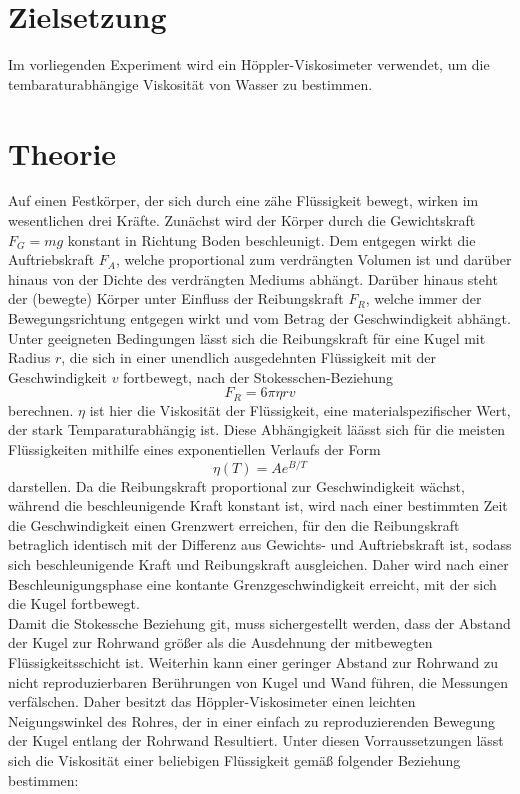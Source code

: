 \section{Zielsetzung}
\label{sec:zielsetzung}
Im vorliegenden Experiment wird ein Höppler-Viskosimeter verwendet, um die  tembaraturabhängige Viskosität von Wasser zu bestimmen.
\section{Theorie}
\label{sec:theorie}
Auf einen Festkörper, der sich durch eine zähe Flüssigkeit bewegt, wirken im wesentlichen drei Kräfte. Zunächst wird der Körper durch die Gewichtskraft $F_G=mg$ konstant in Richtung Boden beschleunigt. Dem entgegen wirkt die Auftriebskraft $F_A$, welche proportional zum verdrängten Volumen ist und darüber hinaus von der Dichte des verdrängten Mediums abhängt. Darüber hinaus steht der (bewegte) Körper unter Einfluss der Reibungskraft $F_R$, welche immer der Bewegungsrichtung entgegen wirkt und vom Betrag der Geschwindigkeit abhängt. Unter geeigneten Bedingungen lässt sich die Reibungskraft für eine Kugel mit Radius $r$, die sich in einer unendlich ausgedehnten Flüssigkeit mit der Geschwindigkeit $v$ fortbewegt, nach der Stokesschen-Beziehung
\begin{equation}
F_R=6\pi \eta rv
\end{equation}
berechnen. $\eta$ ist hier die Viskosität der Flüssigkeit, eine materialspezifischer Wert, der stark Temparaturabhängig ist. Diese Abhängigkeit läässt sich für die meisten Flüssigkeiten mithilfe eines exponentiellen Verlaufs der Form
\begin{equation}
\eta (T) = Ae^{B/T}
\end{equation}
darstellen. Da die Reibungskraft proportional zur Geschwindigkeit wächst, während die beschleunigende Kraft konstant ist, wird nach einer bestimmten Zeit die Geschwindigkeit einen Grenzwert erreichen, für den die Reibungskraft betraglich identisch mit der Differenz aus Gewichts- und Auftriebskraft ist, sodass sich beschleunigende Kraft und Reibungskraft ausgleichen. Daher wird nach einer Beschleunigungsphase eine kontante Grenzgeschwindigkeit erreicht, mit der sich die Kugel fortbewegt. \\
Damit die Stokessche Beziehung git, muss sichergestellt werden, dass der Abstand der Kugel zur Rohrwand größer als die Ausdehnung der mitbewegten Flüssigkeitsschicht ist. Weiterhin kann einer geringer Abstand zur Rohrwand zu nicht reproduzierbaren Berührungen von Kugel und Wand führen, die Messungen verfälschen. Daher besitzt das Höppler-Viskosimeter einen leichten Neigungswinkel des Rohres, der in einer einfach zu reproduzierenden Bewegung der Kugel entlang der Rohrwand Resultiert. Unter diesen Vorraussetzungen lässt sich die Viskosität einer beliebigen Flüssigkeit gemäß folgender Beziehung bestimmen:
